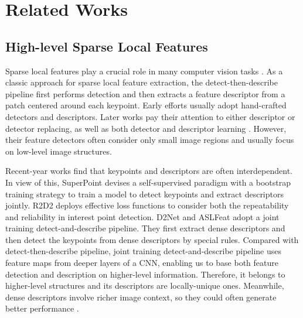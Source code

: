 \documentclass[journal]{IEEEtran}
\begin{document}
\section{Related Works}\label{relatedworks}

\subsection{High-level Sparse Local Features}

Sparse local features play a crucial role in many computer vision tasks \cite{1642666,ORBSLAM3_TRO}. As a classic approach for sparse local feature extraction, the detect-then-describe pipeline first performs detection and then extracts a feature descriptor from a patch centered around each keypoint. Early efforts
\cite{Harris1988ACC,hcrt:21,SURF,BRISK,ORB,BRIEF} usually adopt hand-crafted detectors and descriptors. Later works \cite{c:29,Quad-Networks} pay their attention to either descriptor or detector replacing, as well as both detector and descriptor learning \cite{LIFT,LF-Net}. However, their feature detectors often consider only small image regions and usually focus on low-level image structures.



Recent-year works find that keypoints and descriptors are often interdependent. In view of this, SuperPoint \cite{SuperPoint} devises a self-supervised paradigm with a bootstrap training strategy to train a model to detect keypoints and extract descriptors jointly. R2D2 \cite{R2D2} deploys effective loss functions to consider both the repeatability and reliability in interest point detection. D2Net \cite{D2net} and ASLFeat \cite{aslfeat} adopt a joint training detect-and-describe pipeline. They first extract dense descriptors and then detect the keypoints from dense descriptors by special rules. Compared with detect-then-describe pipeline, joint training detect-and-describe pipeline uses feature maps from deeper layers of a CNN, enabling us to base both feature detection and description on higher-level information.
Therefore, it belongs to higher-level structures and its descriptors are locally-unique ones. Meanwhile, dense descriptors involve richer image context, so they could often generate better performance \cite{cndesc}.
\end{document}
